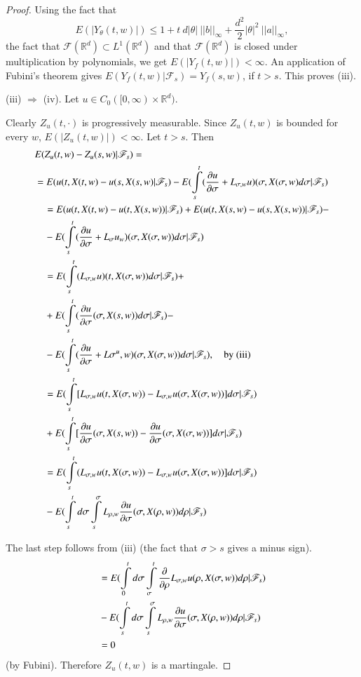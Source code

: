 \begin{proof}
Using the fact that
$$
E(|Y_{\theta}(t,w)|)\leq
1+t~d|\theta|~||b||_{\infty}+\frac{d^{2}}{2}|\theta|^{2}~||a||_{\infty},
$$
the fact that $\mathscr{F}(\mathbb{R}^{d})\subset
L^{1}(\mathbb{R}^{d})$ and that $\mathscr{F}(\mathbb{R}^{d})$ is
closed under multiplication by polynomials, we get
$E(|Y_{f}(t,w)|)<\infty$. An application of Fubini's theorem gives
$E(Y_{f}(t,w)|\mathscr{F}_{s})=Y_{f}(s,w)$, if $t>s$. This proves
(iii).

(iii) $\Rightarrow$ (iv). Let $u\in C_{0}([0,\infty)\times \mathbb{R}^{d})$.

\smallskip
Clearly $Z_{u}(t,\cdot)$ is progressively measurable. Since
$Z_{u}(t,w)$ is boun\-ded for every $w$, $E(|Z_{u}(t,w)|)<\infty$. Let
$t>s$. Then
{\fontsize{10pt}{12pt}\selectfont
\begin{align*}
& E(Z_{u}(t,w)-Z_{u}(s,w)|\mathscr{F}_{s})=\\
& =E(u(t,X(t,w)-u(s,X(s,w)|\mathscr{F}_{s})-E(\int\limits^{t}_{s}(\frac{\partial
  u}{\partial
  \sigma}+L_{\sigma,w}u)(\sigma,X(\sigma,w)d\sigma|\mathscr{F}_{s})\\
&\quad =E(u(t,X(t,w)-u(t,X(s,w))|\mathscr{F}_{s})+E(u(t,X(s,w)-u(s,X(s,w))|\mathscr{F}_{s})-\\
&\quad -E(\int\limits^{t}_{s}(\frac{\partial u}{\partial
  \sigma}+L_{\sigma}u_{w})(\sigma,X(\sigma,w))d\sigma|\mathscr{F}_{s})\\
&\quad =
E(\int\limits^{t}_{s}(L_{\sigma,w}u)(t,X(\sigma,w))d\sigma|\mathscr{F}_{s})+\\ 
&\quad +E(\int\limits^{t}_{s}(\frac{\partial u}{\partial
  \sigma}(\sigma,X(s,w))d\sigma|\mathscr{F}_{s})-\\
&\quad -E(\int\limits^{t}_{s}(\frac{\partial u}{\partial
  \sigma}+L\sigma^{u},w)(\sigma,X(\sigma,w))d\sigma|\mathscr{F}_{s}),\quad\text{by
  (iii)}\\
&\quad =
E(\int\limits^{t}_{s}[L_{\sigma,w}u(t,X(\sigma,w))-L_{\sigma,w}u(\sigma,X(\sigma,w))]d\sigma|\mathscr{F}_{s})\\
&\quad +E(\int\limits^{t}_{s}[\frac{\partial u}{\partial
    \sigma}(\sigma,X(s,w))-\frac{\partial u}{\partial
    \sigma}(\sigma,X(\sigma,w))]d\sigma|\mathscr{F}_{s})\\
&\quad
=E(\int\limits^{t}_{s}(L_{\sigma,w}u(t,X(\sigma,w))-L_{\sigma,w}u(\sigma,X(\sigma,w))]d\sigma|\mathscr{F}_{s})\\
&\quad
-E(\int\limits^{t}_{s}d\sigma\int\limits^{\sigma}_{s}L_{\rho,w}\frac{\partial
  u}{\partial \sigma}(\sigma, X(\rho,w))d\rho|\mathscr{F}_{s})
\end{align*}}\relax\pageoriginale

The last step follows from (iii) (the fact that $\sigma>s$ gives a
minus sign).
\begin{align*}
&=E(\int\limits^{t}_{0}d\sigma\int\limits^{t}_{\sigma}\frac{\partial}{\partial\rho}L_{\sigma,w}u(\rho,X(\sigma,w))d\rho|\mathscr{F}_{s})\\
&-E(\int\limits^{t}_{s}d\sigma\int\limits^{\sigma}_{s}L_{\rho,w}\frac{\partial
    u}{\partial \sigma}(\sigma,X(\rho,w))d\rho|\mathscr{F}_{s})\\
&=0
\end{align*}
(by Fubini). Therefore $Z_{u}(t,w)$ is a martingale.


\end{proof}
